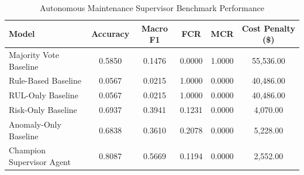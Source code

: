 \begin{table}[h]
\centering
\caption{Autonomous Maintenance Supervisor Benchmark Performance}
\begin{tabular}{lccccc}
\hline
Model & Accuracy & Macro F1 & FCR & MCR & Cost Penalty (\$) \\
\hline
Majority Vote Baseline & 0.5850 & 0.1476 & 0.0000 & 1.0000 & 55,536.00 \\
Rule-Based Baseline & 0.0567 & 0.0215 & 1.0000 & 0.0000 & 40,486.00 \\
RUL-Only Baseline & 0.0567 & 0.0215 & 1.0000 & 0.0000 & 40,486.00 \\
Risk-Only Baseline & 0.6937 & 0.3941 & 0.1231 & 0.0000 & 4,070.00 \\
Anomaly-Only Baseline & 0.6838 & 0.3610 & 0.2078 & 0.0000 & 5,228.00 \\
Champion Supervisor Agent & 0.8087 & 0.5669 & 0.1194 & 0.0000 & 2,552.00 \\
\hline
\end{tabular}
\end{table}
